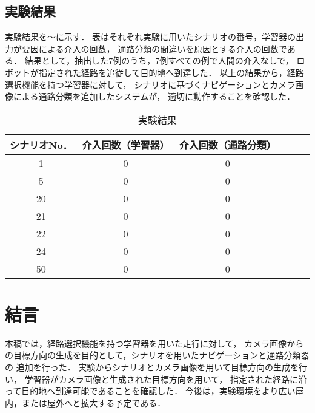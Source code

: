 \documentclass{sice-si}
\begin{document}
\subsection{実験結果}
実験結果を〜に示す．
表はそれぞれ実験に用いたシナリオの番号，学習器の出力が要因による介入の回数，
通路分類の間違いを原因とする介入の回数である．
結果として，抽出した7例のうち，7例すべての例で人間の介入なしで，
ロボットが指定された経路を追従して目的地へ到達した．
以上の結果から，経路選択機能を持つ学習器に対して，
シナリオに基づくナビゲーションとカメラ画像による通路分類を追加したシステムが，
適切に動作することを確認した．
\begin{table}[]
    \centering
    \caption{実験結果}
    \begin{tabular}{ccclll}
    \hline
    シナリオNo． & 介入回数（学習器） & 介入回数（通路分類） \\
    \hline
    1       & 0         & 0             \\
    5       & 0         & 0             \\
    20      & 0         & 0             \\
    21      & 0         & 0             \\
    22      & 0         & 0             \\
    24      & 0         & 0             \\
    50      & 0         & 0             \\
    \hline
    \end{tabular}
    \end{table}

\section{結言}
本稿では，経路選択機能を持つ学習器を用いた走行に対して，
カメラ画像からの目標方向の生成を目的として，シナリオを用いたナビゲーションと通路分類器の
追加を行った．
実験からシナリオとカメラ画像を用いて目標方向の生成を行い，
学習器がカメラ画像と生成された目標方向を用いて，
指定された経路に沿って目的地へ到達可能であることを確認した．
今後は，実験環境をより広い屋内，または屋外へと拡大する予定である．
\end{document}
